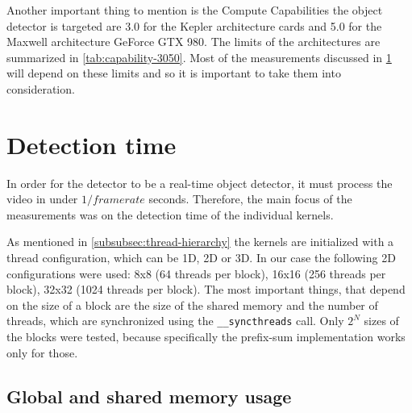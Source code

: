 Another important thing to mention is the Compute Capabilities the object detector is targeted are 3.0 for the Kepler architecture cards and 5.0 for the Maxwell architecture GeForce GTX 980. The limits of the architectures are summarized in \ref{tab:capability-3050}. Most of the measurements discussed in \ref{sec:detection-time} will depend on these limits and so it is important to take them into consideration.

\section{Detection time}\label{sec:detection-time}

In order for the detector to be a real-time object detector, it must process the video in under $1/framerate$ seconds. Therefore, the main focus of the measurements was on the detection time of the individual kernels.

As mentioned in \ref{subsubsec:thread-hierarchy} the kernels are initialized with a thread configuration, which can be 1D, 2D or 3D. In our case the following 2D configurations were used: 8x8 (64 threads per block), 16x16 (256 threads per block), 32x32 (1024 threads per block). The most important things, that depend on the size of a block are the size of the shared memory and the number of threads, which are synchronized using the \verb|__syncthreads| call. Only $2^N$ sizes of the blocks were tested, because specifically the prefix-sum implementation works only for those.

\subsection{Global and shared memory usage}

